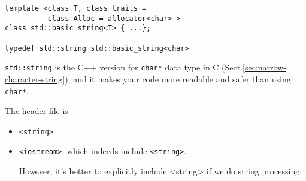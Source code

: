 \begin{Verbatim}
template <class T, class traits = 
          class Alloc = allocator<char> >
class std::basic_string<T> { ...};

typedef std::string std::basic_string<char>
\end{Verbatim}


\verb!std::string! is the C++ version for \verb!char*! data type in C
(Sect.\ref{sec:narrow-character-string}), and it makes your code more readable
and safer than using \verb!char*!. 


The header file is
\begin{itemize} 
  \item \verb!<string>!
  
  \item \verb!<iostream>!: which indeeds include \verb!<string>!.
  
However, it's better to explicitly include <string> if we do string processing.
  
\end{itemize} 

